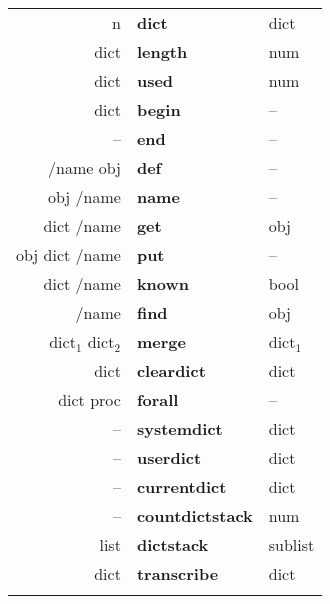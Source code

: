 \begin{tabular}{>{\sffamily}r>{\sffamily\bfseries}l>{\sffamily}l}
n & dict          & dict\\
dict              & length         & num\\
dict              & used           & num\\
dict              & begin          & --\\
--                & end            & --\\
/name obj         & def            & --\\
obj /name         & name           & --\\
dict /name        & get            & obj\\
obj dict /name    & put            & --\\
dict /name        & known          & bool\\
/name             & find           & obj\\
dict$_1$ dict$_2$ & merge          & dict$_1$\\
dict              & cleardict      & dict \\
dict proc         & forall         & --\\
--                & systemdict     & dict\\
--                & userdict       & dict\\
--                & currentdict    & dict\\
--                & countdictstack & num\\
list              & dictstack      & sublist\\
dict              & transcribe     & dict\\\\
\end{tabular}



